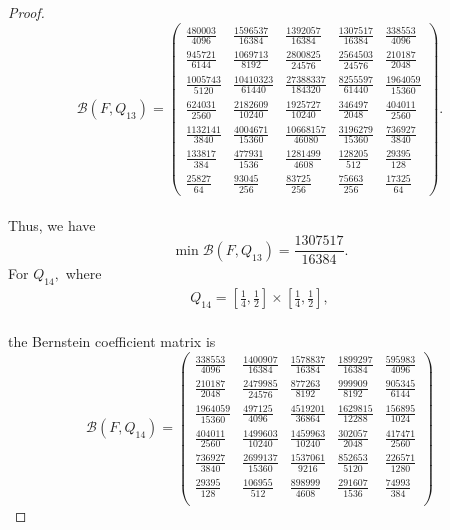 \documentclass[a4paper,12pt,reqno]{amsart} %
\numberwithin{equation}{section}
\theoremstyle{definition}
\begin{document}
\begin{proof}
\[
\mathcal B(F,Q_{13})=
\begin{pmatrix}
	\frac{480003}{4096} & \frac{1596537}{16384} & \frac{1392057}{16384} & \frac{1307517}{16384} & \frac{338553}{4096}\\[5mm]
	\frac{945721}{6144} & \frac{1069713}{8192} & \frac{2800825}{24576} & \frac{2564503}{24576} & \frac{210187}{2048}\\[5mm]
	\frac{1005743}{5120} & \frac{10410323}{61440} & \frac{27388337}{184320} & \frac{8255597}{61440} & \frac{1964059}{15360}\\[5mm]
	\frac{624031}{2560} & \frac{2182609}{10240} & \frac{1925727}{10240} & \frac{346497}{2048} & \frac{404011}{2560}\\[5mm]
	\frac{1132141}{3840} & \frac{4004671}{15360} & \frac{10668157}{46080} & \frac{3196279}{15360} & \frac{736927}{3840}\\[5mm]
	\frac{133817}{384} & \frac{477931}{1536} & \frac{1281499}{4608} & \frac{128205}{512} & \frac{29395}{128}\\[5mm]
	\frac{25827}{64} & \frac{93045}{256} & \frac{83725}{256} & \frac{75663}{256} & \frac{17325}{64}
\end{pmatrix}.
\]\\
Thus, we have 
\[
\min \mathcal B(F,Q_{13})=\frac{1307517}{16384}.
\]
For $Q_{14},$ where
\begin{align*}
	Q_{14}=\left[\frac14,\frac12\right]\times\left[\frac14,\frac12\right],
\end{align*}\\
the Bernstein coefficient matrix is\\
\[
\mathcal B(F,Q_{14})=
\begin{pmatrix}
	\frac{338553}{4096} & \frac{1400907}{16384} & \frac{1578837}{16384} & \frac{1899297}{16384} & \frac{595983}{4096}\\[5mm]
	\frac{210187}{2048} & \frac{2479985}{24576} & \frac{877263}{8192} & \frac{999909}{8192} & \frac{905345}{6144}\\[5mm]
	\frac{1964059}{15360} & \frac{497125}{4096} & \frac{4519201}{36864} & \frac{1629815}{12288} & \frac{156895}{1024}\\[5mm]
	\frac{404011}{2560} & \frac{1499603}{10240} & \frac{1459963}{10240} & \frac{302057}{2048} & \frac{417471}{2560}\\[5mm]
	\frac{736927}{3840} & \frac{2699137}{15360} & \frac{1537061}{9216} & \frac{852653}{5120} & \frac{226571}{1280}\\[5mm]
	\frac{29395}{128} & \frac{106955}{512} & \frac{898999}{4608} & \frac{291607}{1536} & \frac{74993}{384}\\[5mm]

\end{pmatrix}\]
\end{proof}
\end{document}
